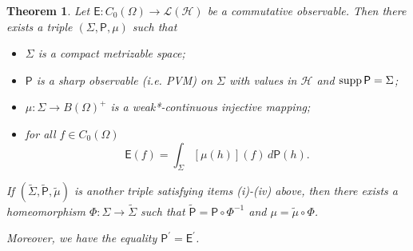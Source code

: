 \documentclass[12pt]{amsart}
\newtheorem{theorem}{Theorem}
\theoremstyle{definition}
\newcommand{\hi}{\mathcal{H}} %
\newcommand{\lh}{\mathcal{L(H)}} %
\newcommand{\Eo}{\mathsf{E}} %
\newcommand{\PP}{\mathsf{P}} %
\newcommand{\supp}{{\rm supp}\,}
\newcommand{\de}{\, d}
\newcommand{\frecc}{\rightarrow}
\begin{document}
\begin{theorem}\label{th:first}
Let $\Eo : C_0 (\Omega) \frecc \lh$ be a commutative observable. Then there exists a triple
$(\Sigma,\PP,\mu)$ such that
\begin{itemize}
\item[\rm (i)] $\Sigma$ is a compact metrizable space;
\item[\rm (ii)] $\PP$ is a sharp observable (i.e. PVM) on $\Sigma$ with values in $\hi$ and $\supp \PP = \Sigma$;
\item[\rm (iii)] $\mu : \Sigma \frecc B(\Omega)^+$ is a weak*-continuous injective mapping;
\item[\rm (iv)] for all $f\in C_0 (\Omega)$
\begin{equation}\label{eq. princ.}
\Eo(f) = \int_\Sigma [\mu (h)] (f) \de \PP (h).
\end{equation}
\end{itemize}

If $( \tilde{\Sigma},\tilde{\PP},\tilde{\mu} )$ is another triple satisfying
items {\rm (i)-(iv)} above, then there exists a homeomorphism
$\Phi : \Sigma \frecc \tilde{\Sigma}$ such that $\tilde{\PP} = \PP \circ \Phi^{-1}$ and
$\mu = \tilde{\mu} \circ \Phi$.

Moreover, we have the equality $\PP^\prime = \Eo^\prime$.
\end{theorem}
\end{document}
